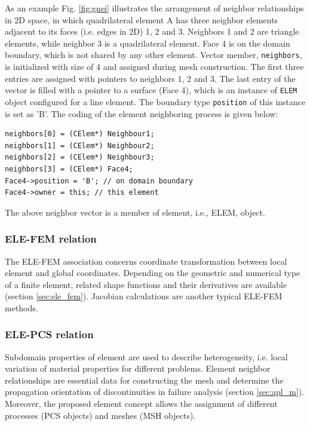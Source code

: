 As an example Fig. \ref{fig:gnei} illustrates the arrangement of
neighbor relationships in 2D space, in which quadrilateral
element A has three neighbor elements adjacent to its faces (i.e.
edges in 2D) 1, 2 and 3. Neighbors 1 and 2 are triangle elements,
while neighbor 3 is a quadrilateral element. Face 4 is on the
domain boundary, which is not shared by any other element. Vector
member, \texttt{neighbors}, is initialized with size of 4 and
assigned during mesh construction. The first three entries are
assigned with pointers to neighbors 1, 2 and 3. The last entry of
the vector is filled with a pointer to a surface (Face 4), which
is an instance of \texttt{ELEM} object configured for a line
element. The boundary type \texttt{position} of this instance is
set as 'B'. The coding of the element neighboring process is given
below:

\small
\begin{center}
\begin{verbatim}
neighbors[0] = (CElem*) Neighbour1;
neighbors[1] = (CElem*) Neighbour2;
neighbors[2] = (CElem*) Neighbour3;
neighbors[3] = (CElem*) Face4;
Face4->position = 'B'; // on domain boundary
Face4->owner = this; // this element
\end{verbatim}
\end{center}
\normalsize

The above neighbor vector is a member of element,
i.e., ELEM, object.

\subsubsection{ELE-FEM relation}

The ELE-FEM association concerns coordinate transformation between
local element and global coordinates. Depending on the geometric
and numerical type of a finite element, related shape functions
and their derivatives are available (section \ref{sec:ele_fem}).
Jacobian calculations are another typical ELE-FEM methods.

\subsubsection{ELE-PCS relation}

Subdomain properties of element are used to describe heterogeneity, 
i.e. local variation of material properties for different problems. 
Element neighbor relationships are essential data for constructing 
the mesh and determine the propagation orientation of 
discontinuities in failure analysis (section \ref{sec:apl_m}). 
Moreover, the proposed element concept allows the assignment of 
different processes (PCS objects) and meshes (MSH objects). 
